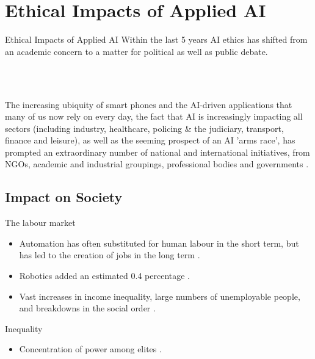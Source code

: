 \documentclass{beamer}
\begin{document}
\section{Ethical Impacts of Applied AI}

\begin{frame}{Ethical Impacts of Applied AI}
Within the last 5 years AI ethics has shifted from an academic concern to a matter for political as well 
as public debate.

\\~\

The increasing ubiquity of smart phones and the AI-driven applications that many  of us now rely on every day, the fact that AI is increasingly impacting all sectors (including industry,  healthcare, policing & the judiciary, transport, finance and leisure), as well as the seeming prospect  of an AI 'arms race', has prompted an extraordinary number of national and international initiatives, from NGOs, academic and industrial groupings, professional bodies and governments \citep{bird2020ethics}.
\end{frame}

\subsection{Impact on Society}

\begin{frame}{The labour market}
\begin{itemize}
    \item Automation has often substituted for human labour in the short term, but has led to the creation of jobs in the long term \citep{david2015there}.
    \item Robotics added an estimated 0.4 percentage \citep{graetz2015robots}.
    \item Vast increases in income inequality, large numbers of unemployable people, and breakdowns in the social order 
\citep{smith2014ai}.
\end{itemize}


\end{frame}


\begin{frame}{Inequality}
\begin{itemize}
    \item Concentration of power among elites \citep{nemitz2018constitutional}.
\end{itemize}
\end{frame}
\end{document}
